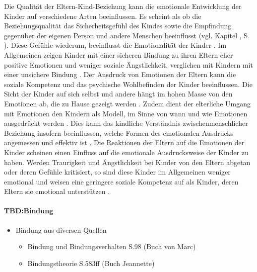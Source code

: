 Die Qualität der Eltern-Kind-Beziehung kann die emotionale Entwicklung der Kinder auf verschiedene Arten beeinflussen. Es scheint als ob die Beziehungsqualität das Sicherheitsgefühl des Kindes sowie die Empfindung gegenüber der eigenen Person und andere Menschen beeinflusst (vgl. Kapitel , S. \pageref{sec:Bindung}). Diese Gefühle wiederum, beeinflusst die Emotionalität der Kinder \cite[S.~561]{Siegler2008}. Im Allgemeinen zeigen Kinder mit einer sicheren Bindung zu ihren Eltern eher positive Emotionen und weniger soziale Ängstlichkeit, verglichen mit Kindern mit einer unsichere Bindung \cite{Bohlin2000}. Der Ausdruck von Emotionen der Eltern kann die soziale Kompetenz und das psychische Wohlbefinden der Kinder beeinflussen. Die Sicht der Kinder auf sich selbst und andere hängt im hohen Masse von den Emotionen ab, die zu Hause gezeigt werden \cite{Dunsmore1997}. Zudem dient der elterliche Umgang mit Emotionen den Kindern als Modell, im Sinne von wann und wie Emotionen ausgedrückt werden \cite{Denham1994}. Dies kann das kindliche Verständnis zwischenmenschlicher Beziehung insofern beeinflussen, welche Formen des emotionalen Ausdrucks angemessen und effektiv ist \cite{Halberstadt1995}. Die Reaktionen der Eltern auf die Emotionen der Kinder scheinen einen Einfluss auf die emotionale Ausdrucksweise der Kinder zu haben. Werden Traurigkeit und Ängstlichkeit bei Kinder von den Eltern abgetan oder deren Gefühle kritisiert, so sind diese Kinder im Allgemeinen weniger emotional und weisen eine geringere soziale Kompetenz auf als Kinder, deren Eltern sie emotional unterstützen \cite{Eisenberg1998, McDowell2000}. 

\paragraph{TBD:Bindung}\label{par:Bindung}
\begin{itemize}
    \item Bindung aus diversen Quellen
    \begin{itemize}
        \item Bindung und Bindungsverhalten S.98  (Buch von Marc)
        \item Bindungstheorie S.583ff  (Buch Jeannette)
    \end{itemize}
\end{itemize}

